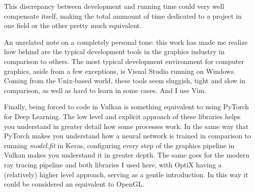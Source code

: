This discrepancy between development and running time could very well compensate itself, making the total ammount of time dedicated to a project in one field or the other pretty much equivalent.

An unrelated note on a completely personal tone: this work has made me realize how behind are the typical development tools in the graphics industry in comparison to others. The most typical development environment for computer graphics, aside from a few exceptions, is Visual Studio running on Windows. Coming from the Unix-based world, these tools seem sluggish, tight and slow in comparison, as well as hard to learn in some cases. And I use Vim.

Finally, being forced to code in Vulkan is something equivalent to using PyTorch for Deep Learning. The low level and explicit approach of these libraries helps you understand in greater detail how some processes work. In the same way that PyTorch makes you understand how a neural network is trained in comparison to running \textit{model.fit} in Keras, configuring every step of the graphics pipeline in Vulkan makes you understand it in greater depth. The same goes for the modern ray tracing pipeline and both libraries I used here, with OptiX having a (relatively) higher level approach, serving as a gentle introduction. In this way it could be considered an equivalent to OpenGL.

